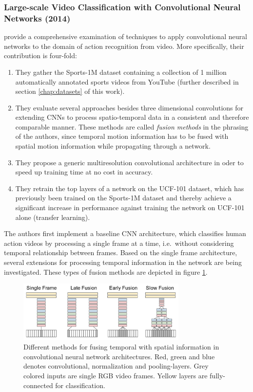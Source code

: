 \subsubsection{Large-scale Video Classification with Convolutional Neural Networks (2014)}
\textcite{karpathy_large-scale_2014} provide a comprehensive examination of techniques to apply convolutional neural networks to the domain of action recognition from video.
More specifically, their contribution is four-fold:
\begin{enumerate}
    \item They gather the Sports-1M dataset containing a collection of 1 million automatically annotated sports videos from YouTube (further described in section \ref{chap:datasets} of this work).
    \item They evaluate several approaches besides three dimensional convolutions for extending CNNs to process spatio-temporal data in a consistent and therefore comparable manner. These methods are called \textit{fusion methods} in the phrasing of the authors, since temporal motion information has to be fused with spatial motion information while propagating through a network.
    \item They propose a generic multiresolution convolutional architecture in oder to speed up training time at no cost in accuracy.
    \item They retrain the top layers of a network on the UCF-101 dataset, which has previously been trained on the Sports-1M dataset and thereby achieve a significant increase in performance against training the network on UCF-101 alone (transfer learning).
\end{enumerate}

The authors first implement a baseline CNN architecture, which classifies human action videos by processing a single frame at a time, i.e.\ without considering temporal relationship between frames.
Based on the single frame architecture, several extensions for processing temporal information in the network are being investigated. These types of fusion methods are depicted in figure \ref{fig:largescale_fusionmethods}.

\begin{figure}[H]
    \centering
    \includegraphics[width=0.75\textwidth]{img_deep/largescale_fusionmethods}
    \caption{Different methods for fusing temporal with spatial information in convolutional neural network architectures. Red, green and blue denotes convolutional, normalization and pooling-layers. Grey colored inputs are single RGB video frames. Yellow layers are fully-connected for classification. \cite{karpathy_large-scale_2014}}
    \label{fig:largescale_fusionmethods}
\end{figure}

